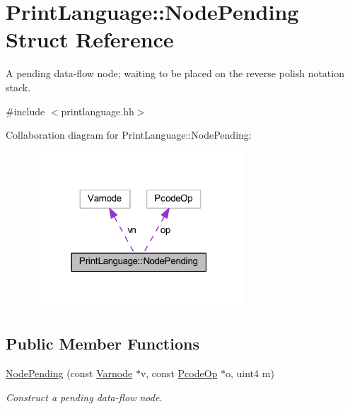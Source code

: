 \hypertarget{struct_print_language_1_1_node_pending}{}\section{Print\+Language\+::Node\+Pending Struct Reference}
\label{struct_print_language_1_1_node_pending}


A pending data-\/flow node; waiting to be placed on the reverse polish notation stack.  




{\ttfamily \#include $<$printlanguage.\+hh$>$}



Collaboration diagram for Print\+Language\+::Node\+Pending\+:
\nopagebreak
\begin{figure}[H]
\begin{center}
\leavevmode
\includegraphics[width=223pt]{struct_print_language_1_1_node_pending__coll__graph}
\end{center}
\end{figure}
\subsection*{Public Member Functions}
\begin{DoxyCompactItemize}
\item 
\mbox{\hyperlink{struct_print_language_1_1_node_pending_a900ea3ad753bfed285208b4ac9cfc4c6}{Node\+Pending}} (const \mbox{\hyperlink{class_varnode}{Varnode}} $\ast$v, const \mbox{\hyperlink{class_pcode_op}{Pcode\+Op}} $\ast$o, uint4 m)
\begin{DoxyCompactList}\small\item\em Construct a pending data-\/flow node. \end{DoxyCompactList}\end{DoxyCompactItemize}
